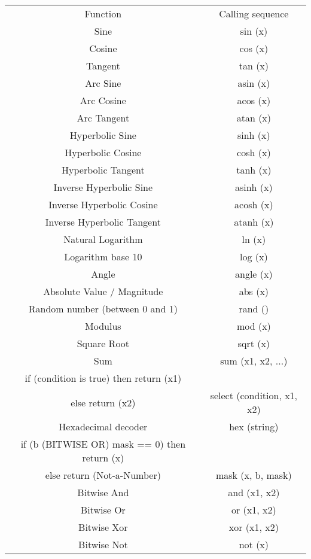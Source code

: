 \begin{tabular}{|c|c|}
\hline 
 & \\
 \hline 
Function &Calling sequence \\
 \hline 
Sine &sin (x) \\
 \hline 
Cosine &cos (x) \\
 \hline 
Tangent &tan (x) \\
 \hline 
Arc Sine &asin (x) \\
 \hline 
Arc Cosine &acos (x) \\
 \hline 
Arc Tangent &atan (x) \\
 \hline 
Hyperbolic Sine &sinh (x) \\
 \hline 
Hyperbolic Cosine &cosh (x) \\
 \hline 
Hyperbolic Tangent &tanh (x) \\
 \hline 
Inverse Hyperbolic Sine &asinh (x) \\
 \hline 
Inverse Hyperbolic Cosine &acosh (x) \\
 \hline 
Inverse Hyperbolic Tangent &atanh (x) \\
 \hline 
Natural Logarithm &ln (x) \\
 \hline 
Logarithm base 10 &log (x) \\
 \hline 
Angle &angle (x) \\
 \hline 
Absolute Value / Magnitude &abs (x) \\
 \hline 
Random number (between 0 and 1) &rand () \\
 \hline 
Modulus &mod (x) \\
 \hline 
Square Root &sqrt (x) \\
 \hline 
Sum &sum (x1, x2, ...) \\
 \hline 
if (condition is true) then return (x1)\\ 
 else return (x2) &select (condition, x1, x2) \\
 \hline 
Hexadecimal decoder &hex (string) \\
 \hline 
if (b (BITWISE OR) mask == 0) then return (x)\\ 
 else return (Not-a-Number) &mask (x, b, mask) \\
 \hline 
Bitwise And &and (x1, x2) \\
 \hline 
Bitwise Or &or (x1, x2) \\
 \hline 
Bitwise Xor &xor (x1, x2) \\
 \hline 
Bitwise Not &not (x) \\
 \hline 

\end{tabular}



